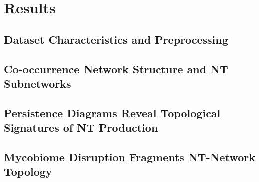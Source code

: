 \section{Results}
\label{sec:results}


\subsection{Dataset Characteristics and Preprocessing}

\subsection{Co-occurrence Network Structure and NT Subnetworks}
\label{subsec:network_results}

\subsection{Persistence Diagrams Reveal Topological Signatures of NT Production}
\label{subsec:persistence_results}

\subsection{Mycobiome Disruption Fragments NT-Network Topology}
\label{subsec:mycobiome_results}

